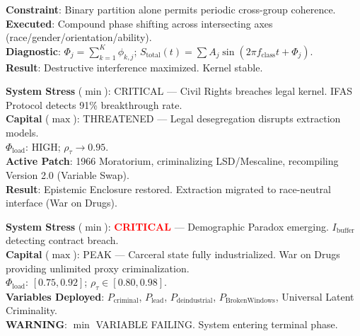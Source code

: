\documentclass[12pt,openany]{book}
\begin{document}
\begin{tcolorbox}[colback=black!5, colframe=black!70, fonttitle=\bfseries\ttfamily, title=6. RUNTIME LOG: v5.0 (FRACTAL INTERFERENCE ENGINE) \normalfont\small--- Chapter 6]
\ttfamily\small
\textbf{Constraint}: Binary partition alone permits periodic cross-group coherence.\\
\textbf{Executed}: Compound phase shifting across intersecting axes (race/gender/orientation/ability).\\
\textbf{Diagnostic}: $\Phi_j = \sum_{k=1}^{K}\phi_{k,j}$; $S_{\text{total}}(t) = \sum A_j\sin(2\pi f_{\text{class}}t + \Phi_j)$.\\
\textbf{Result}: Destructive interference maximized. Kernel stable.
\end{tcolorbox}

\begin{tcolorbox}[colback=black!5, colframe=black!70, fonttitle=\bfseries\ttfamily, title=7. RUNTIME LOG: 1966 (SECURITY PATCH) \normalfont\small--- Chapter 7]
\ttfamily\small
\textbf{System Stress} ($\min$): CRITICAL --- Civil Rights breaches legal kernel. IFAS Protocol detects 91\% breakthrough rate.\\
\textbf{Capital} ($\max$): THREATENED --- Legal desegregation disrupts extraction models.\\
\textbf{$\Phi_{\text{load}}$}: HIGH; $\rho_{\tau} \rightarrow 0.95$.\\
\textbf{Active Patch}: 1966 Moratorium, criminalizing LSD/Mescaline, recompiling Version 2.0 (Variable Swap).\\
\textbf{Result}: Epistemic Enclosure restored. Extraction migrated to race-neutral interface (War on Drugs).
\end{tcolorbox}

\begin{tcolorbox}[colback=black!5, colframe=black!70, fonttitle=\bfseries\ttfamily, title=8. RUNTIME LOG: 1968--PRESENT (NATIONAL) \normalfont\small--- Chapter 7]
\ttfamily\small
\textbf{System Stress} ($\min$): \textcolor{red}{\textbf{CRITICAL}} --- Demographic Paradox emerging. $I_{\text{buffer}}$ detecting contract breach.\\
\textbf{Capital} ($\max$): PEAK --- Carceral state fully industrialized. War on Drugs providing unlimited proxy criminalization.\\
\textbf{$\Phi_{\text{load}}$}: $[0.75, 0.92]$; $\rho_{\tau} \in [0.80, 0.98]$.\\
\textbf{Variables Deployed}: $P_{\text{criminal}}$, $P_{\text{lead}}$, $P_{\text{deindustrial}}$, $P_{\text{BrokenWindows}}$, Universal Latent Criminality.\\
\textbf{WARNING}: $\min$ VARIABLE FAILING. System entering terminal phase.
\end{tcolorbox}
\end{document}
